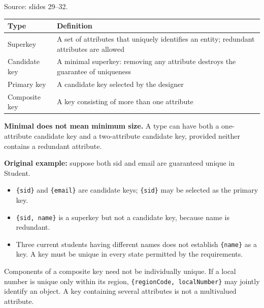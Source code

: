 Source: slides 29--32.

\begin{longtable}[]{@{}
  >{\raggedright\arraybackslash}p{}
  >{\raggedright\arraybackslash}p{}@{}}
\toprule\noalign{}
\begin{minipage}[b]{\linewidth}\raggedright
Type
\end{minipage} & \begin{minipage}[b]{\linewidth}\raggedright
Definition
\end{minipage} \\
\midrule\noalign{}
\endhead
\bottomrule\noalign{}
\endlastfoot
Superkey & A set of attributes that uniquely identifies an entity; redundant attributes are allowed \\
Candidate key & A minimal superkey: removing any attribute destroys the guarantee of uniqueness \\
Primary key & A candidate key selected by the designer \\
Composite key & A key consisting of more than one attribute \\
\end{longtable}

\textbf{Minimal does not mean minimum size.} A type can have both a one-attribute candidate key and a two-attribute candidate key, provided neither contains a redundant attribute.

\textbf{Original example:} suppose both sid and email are guaranteed unique in Student.

\begin{itemize}
\tightlist
\item
  \texttt{\{sid\}} and \texttt{\{email\}} are candidate keys; \texttt{\{sid\}} may be selected as the primary key.
\item
  \texttt{\{sid,\ name\}} is a superkey but not a candidate key, because name is redundant.
\item
  Three current students having different names does not establish \texttt{\{name\}} as a key. A key must be unique in every state permitted by the requirements.
\end{itemize}

Components of a composite key need not be individually unique. If a local number is unique only within its region, \texttt{\{regionCode,\ localNumber\}} may jointly identify an object. A key containing several attributes is not a multivalued attribute.

